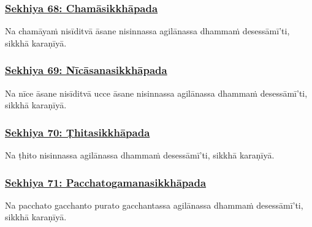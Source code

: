\subsubsection*{\hyperref[training68]{Sekhiya 68: Chamāsikkhāpada}}
\label{sekh68}

Na chamāyaṁ\makeatletter\hyperlink{endnote518-appendix}\makeatother{} nisīditvā āsane nisinnassa agilānassa dhammaṁ desessāmī'ti, sikkhā karaṇīyā.



\subsubsection*{\hyperref[training69]{Sekhiya 69: Nīcāsanasikkhāpada}}
\label{sekh69}

Na nīce\makeatletter\hyperlink{endnote519-appendix}\makeatother{} āsane nisīditvā ucce āsane nisinnassa agilānassa dhammaṁ desessāmī'ti, sikkhā karaṇīyā.



\subsubsection*{\hyperref[training70]{Sekhiya 70: Ṭhitasikkhāpada}}
\label{sekh70}

Na ṭhito nisinnassa agilānassa dhammaṁ desessāmī'ti, sikkhā karaṇīyā.\makeatletter\hyperlink{endnote520-appendix}\makeatother{}



\subsubsection*{\hyperref[training71]{Sekhiya 71: Pacchatogamanasikkhāpada}}
\label{sekh71}

Na pacchato gacchanto purato\makeatletter\hyperlink{endnote521-appendix}\makeatother{} gacchantassa agilānassa dhammaṁ desessāmī'ti, sikkhā karaṇīyā.



